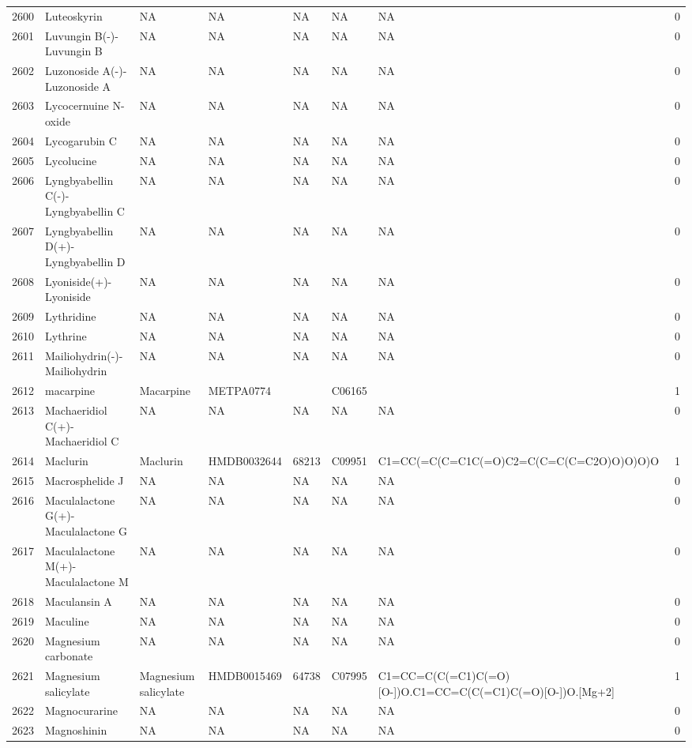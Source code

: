 \documentclass[a4paper]{article}
\begin{document}
\begin{longtable}{rlllllll}
  2600 & Luteoskyrin & NA & NA & NA & NA & NA & 0 \\ 
  2601 & Luvungin B(-)-Luvungin B & NA & NA & NA & NA & NA & 0 \\ 
  2602 & Luzonoside A(-)-Luzonoside A & NA & NA & NA & NA & NA & 0 \\ 
  2603 & Lycocernuine N-oxide & NA & NA & NA & NA & NA & 0 \\ 
  2604 & Lycogarubin C & NA & NA & NA & NA & NA & 0 \\ 
  2605 & Lycolucine & NA & NA & NA & NA & NA & 0 \\ 
  2606 & Lyngbyabellin C(-)-Lyngbyabellin C & NA & NA & NA & NA & NA & 0 \\ 
  2607 & Lyngbyabellin D(+)-Lyngbyabellin D & NA & NA & NA & NA & NA & 0 \\ 
  2608 & Lyoniside(+)-Lyoniside & NA & NA & NA & NA & NA & 0 \\ 
  2609 & Lythridine & NA & NA & NA & NA & NA & 0 \\ 
  2610 & Lythrine & NA & NA & NA & NA & NA & 0 \\ 
  2611 & Mailiohydrin(-)-Mailiohydrin & NA & NA & NA & NA & NA & 0 \\ 
  2612 & macarpine & Macarpine & METPA0774 &  & C06165 &  & 1 \\ 
  2613 & Machaeridiol C(+)-Machaeridiol C & NA & NA & NA & NA & NA & 0 \\ 
  2614 & Maclurin & Maclurin & HMDB0032644 & 68213 & C09951 & C1=CC(=C(C=C1C(=O)C2=C(C=C(C=C2O)O)O)O)O & 1 \\ 
  2615 & Macrosphelide J & NA & NA & NA & NA & NA & 0 \\ 
  2616 & Maculalactone G(+)-Maculalactone G & NA & NA & NA & NA & NA & 0 \\ 
  2617 & Maculalactone M(+)-Maculalactone M & NA & NA & NA & NA & NA & 0 \\ 
  2618 & Maculansin A & NA & NA & NA & NA & NA & 0 \\ 
  2619 & Maculine & NA & NA & NA & NA & NA & 0 \\ 
  2620 & Magnesium carbonate & NA & NA & NA & NA & NA & 0 \\ 
  2621 & Magnesium salicylate & Magnesium salicylate & HMDB0015469 & 64738 & C07995 & C1=CC=C(C(=C1)C(=O)[O-])O.C1=CC=C(C(=C1)C(=O)[O-])O.[Mg+2] & 1 \\ 
  2622 & Magnocurarine & NA & NA & NA & NA & NA & 0 \\ 
  2623 & Magnoshinin & NA & NA & NA & NA & NA & 0 \\ 

\end{longtable}
\end{document}
